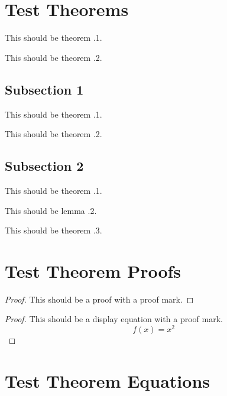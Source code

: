 
\section{Test Theorems}

\begin{theorem}
    This should be theorem \thesection.1.
\end{theorem}
\begin{theorem}
    This should be theorem \thesection.2.
\end{theorem}

\subsection{Subsection 1}

\begin{theorem}
    This should be theorem \thesubsection.1.
\end{theorem}
\begin{theorem}
    This should be theorem \thesubsection.2.
\end{theorem}

\subsection{Subsection 2}

\begin{theorem}
    This should be theorem \thesubsection.1.
\end{theorem}
\begin{lemma}
    This should be lemma \thesubsection.2.
\end{lemma}
\begin{theorem}
    This should be theorem \thesubsection.3.
\end{theorem}


\section{Test Theorem Proofs}

\begin{proof}
    This should be a proof with a proof mark.
\end{proof}

\begin{proof}
    This should be a display equation with a proof mark.
    \[ f(x) = x^2 \]
\end{proof}


\section{Test Theorem Equations}


